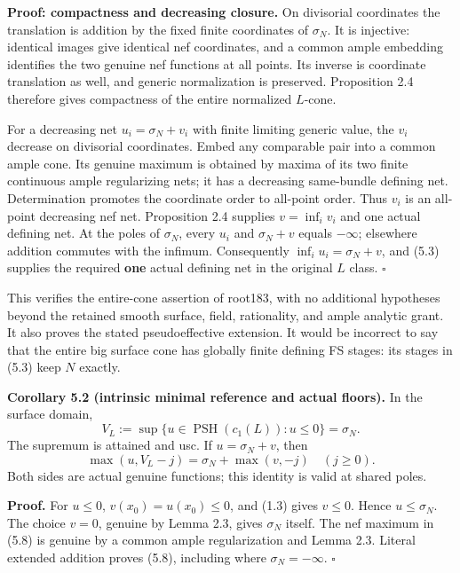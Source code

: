 \documentclass[
  10pt,
]{article}
\begin{document}
\textbf{Proof: compactness and decreasing closure.} On divisorial
coordinates the translation is addition by the fixed finite coordinates
of \(\sigma_N\). It is injective: identical images give identical nef
coordinates, and a common ample embedding identifies the two genuine nef
functions at all points. Its inverse is coordinate translation as well,
and generic normalization is preserved. Proposition 2.4 therefore gives
compactness of the entire normalized \(L\)-cone.

For a decreasing net \(u_i=\sigma_N+v_i\) with finite limiting generic
value, the \(v_i\) decrease on divisorial coordinates. Embed any
comparable pair into a common ample cone. Its genuine maximum is
obtained by maxima of its two finite continuous ample regularizing nets;
it has a decreasing same-bundle defining net. Determination promotes the
coordinate order to all-point order. Thus \(v_i\) is an all-point
decreasing nef net. Proposition 2.4 supplies \(v=\inf_i v_i\) and one
actual defining net. At the poles of \(\sigma_N\), every \(u_i\) and
\(\sigma_N+v\) equals \(-\infty\); elsewhere addition commutes with the
infimum. Consequently \(\inf_i u_i=\sigma_N+v\), and (5.3) supplies the
required \textbf{one} actual defining net in the original \(L\) class.
\(\square\)

This verifies the entire-cone assertion of root183, with no additional
hypotheses beyond the retained smooth surface, field, rationality, and
ample analytic grant. It also proves the stated pseudoeffective
extension. It would be incorrect to say that the entire big surface cone
has globally finite defining FS stages: its stages in (5.3) keep \(N\)
exactly.

\textbf{Corollary 5.2 (intrinsic minimal reference and actual floors).}
In the surface domain, \[
 V_L:=\sup\{u\in\operatorname{PSH}(c_1(L)):u\leq0\}=\sigma_N.
                                                               \tag{5.7}
\] The supremum is attained and usc. If \(u=\sigma_N+v\), then \[
 \max(u,V_L-j)=\sigma_N+\max(v,-j)\quad(j\geq0).                 \tag{5.8}
\] Both sides are actual genuine functions; this identity is valid at
shared poles.

\textbf{Proof.} For \(u\leq0\), \(v(x_0)=u(x_0)\leq0\), and (1.3) gives
\(v\leq0\). Hence \(u\leq\sigma_N\). The choice \(v=0\), genuine by
Lemma 2.3, gives \(\sigma_N\) itself. The nef maximum in (5.8) is
genuine by a common ample regularization and Lemma 2.3. Literal extended
addition proves (5.8), including where \(\sigma_N=-\infty\). \(\square\)
\end{document}
